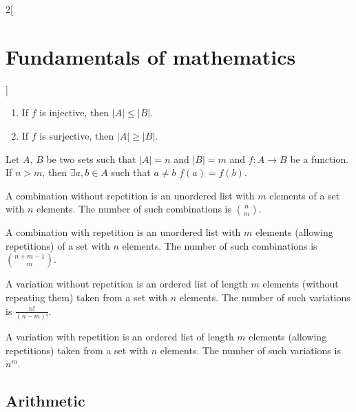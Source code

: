 \documentclass[../../../main_math.tex]{subfiles}
\begin{document}
\begin{multicols}{2}[\section{Fundamentals of mathematics}]
\begin{corollary}
    \begin{enumerate}
      \item If $f$ is injective, then $|A|\leq|B|$.
      \item If $f$ is surjective, then $|A|\geq|B|$.
    \end{enumerate}
  \end{corollary}
  \begin{theorem}
    Let $A$, $B$ be two sets such that $|A|=n$ and $|B|=m$ and $f:A\rightarrow B$ be a function. If $n>m$, then $\exists a,b\in A$ such that $a\ne b$ $f(a)=f(b)$.
  \end{theorem}
  \begin{proposition}
    A combination without repetition is an unordered list with $m$ elements of a set with $n$ elements. The number of such combinations is $\binom{n}{m}$.
  \end{proposition}
  \begin{proposition}
    A combination with repetition is an unordered list with $m$ elements (allowing repetitions) of a set with $n$ elements. The number of such combinations is  $\binom{n+m-1}{m}$.
  \end{proposition}
  \begin{proposition}
    A variation without repetition is an ordered list of length $m$ elements (without repeating them) taken from a set with $n$ elements. The number of such variations is $\frac{n!}{(n-m)!}$.
  \end{proposition}
  \begin{proposition}
    A variation with repetition is an ordered list of length $m$ elements (allowing repetitions) taken from a set with $n$ elements. The number of such variations is $n^m$.
  \end{proposition}
  \subsection{Arithmetic}

\end{multicols}
\end{document}
